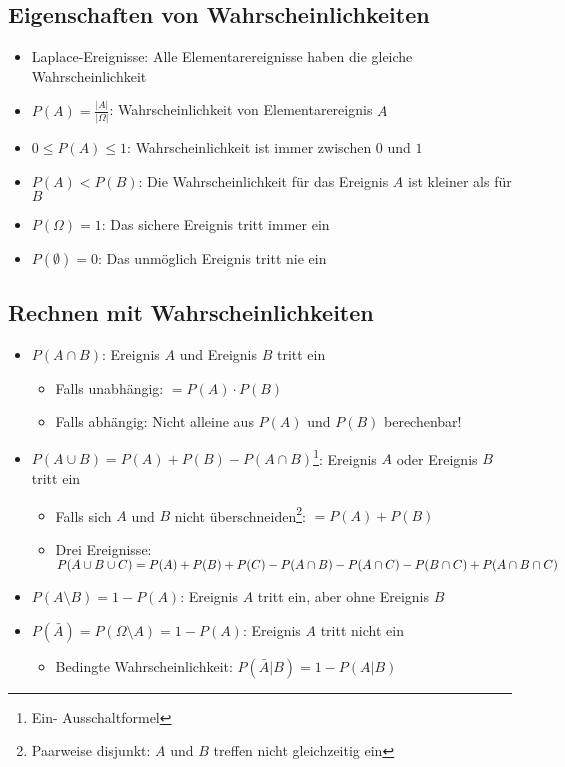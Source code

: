 \subsection{Eigenschaften von Wahrscheinlichkeiten}
\begin{itemize}
  \item Laplace-Ereignisse: Alle Elementarereignisse haben die gleiche
    Wahrscheinlichkeit
  \item $P(A) = \frac{|A|}{|\Omega|}$: Wahrscheinlichkeit von
    Elementarereignis $A$
  \item $0 \le P(A) \le 1$: Wahrscheinlichkeit ist immer zwischen $0$
    und $1$
  \item $P(A) < P(B)$: Die Wahrscheinlichkeit für das Ereignis $A$ ist
    kleiner als für $B$
  \item $P(\Omega) = 1$: Das sichere Ereignis tritt immer ein
  \item $P(\emptyset) = 0$: Das unmöglich Ereignis tritt nie ein
\end{itemize}

\subsection{Rechnen mit Wahrscheinlichkeiten}
\begin{itemize}
  \item $P(A \cap B)$: Ereignis $A$ und Ereignis $B$ tritt ein
    \begin{itemize}
      \item Falls unabhängig: $= P(A) \cdot P(B)$
      \item Falls abhängig: Nicht alleine aus $P(A)$ und $P(B)$
        berechenbar!
    \end{itemize}
  \item $P(A \cup B) = P(A) + P(B) - P(A \cap B)$\footnote{Ein-
    Ausschaltformel}: Ereignis $A$ oder Ereignis $B$ tritt ein
    \begin{itemize}
      \item Falls sich $A$ und $B$ nicht überschneiden\footnote{
        Paarweise disjunkt: $A$ und $B$ treffen nicht gleichzeitig ein}:
        $= P(A) + P(B)$
      \item Drei Ereignisse: $P(A \cup B \cup C) \\ = P(A) + P(B) + P(C)
        - P(A \cap B) - P(A \cap C) - P(B \cap C) + P(A \cap B \cap C)$
    \end{itemize}
  \item $P(A \setminus B) = 1 - P(A)$: Ereignis $A$ tritt ein, aber ohne
    Ereignis $B$
  \item $P(\bar{A}) = P(\Omega \setminus A) = 1 - P(A)$: Ereignis $A$
    tritt nicht ein
  \begin{itemize}
    \item Bedingte Wahrscheinlichkeit: $P(\bar{A}|B) = 1 - P(A|B)$
  \end{itemize}
\end{itemize}

